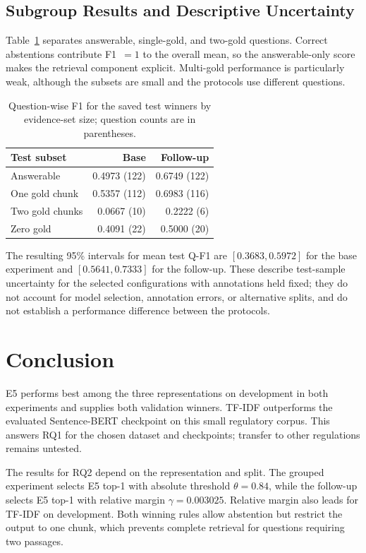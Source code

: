 \documentclass[11pt]{article}
\begin{document}
\subsection{Subgroup Results and Descriptive Uncertainty}
\label{sec:uncertainty}

Table~\ref{tab:subgroups} separates answerable, single-gold, and two-gold questions. Correct abstentions contribute F1~$=1$ to the overall mean, so the answerable-only score makes the retrieval component explicit. Multi-gold performance is particularly weak, although the subsets are small and the protocols use different questions.

\begin{table}[t]
\centering
\small
\begin{tabular}{lrr}
\toprule
\textbf{Test subset} & \textbf{Base} & \textbf{Follow-up} \\
\midrule
Answerable & 0.4973 (122) & 0.6749 (122) \\
One gold chunk & 0.5357 (112) & 0.6983 (116) \\
Two gold chunks & 0.0667 (10) & 0.2222 (6) \\
Zero gold & 0.4091 (22) & 0.5000 (20) \\
\bottomrule
\end{tabular}
\caption{Question-wise F1 for the saved test winners by evidence-set size; question counts are in parentheses.}
\label{tab:subgroups}
\end{table}

The resulting 95\% intervals for mean test Q-F1 are $[0.3683,0.5972]$ for the base experiment and $[0.5641,0.7333]$ for the follow-up. These describe test-sample uncertainty for the selected configurations with annotations held fixed; they do not account for model selection, annotation errors, or alternative splits, and do not establish a performance difference between the protocols.

\section{Conclusion}

E5 performs best among the three representations on development in both experiments and supplies both validation winners. TF-IDF outperforms the evaluated Sentence-BERT checkpoint on this small regulatory corpus. This answers RQ1 for the chosen dataset and checkpoints; transfer to other regulations remains untested.

The results for RQ2 depend on the representation and split. The grouped experiment selects E5 top-1 with absolute threshold $\theta=0.84$, while the follow-up selects E5 top-1 with relative margin $\gamma=0.003025$. Relative margin also leads for TF-IDF on development. Both winning rules allow abstention but restrict the output to one chunk, which prevents complete retrieval for questions requiring two passages.
\end{document}
